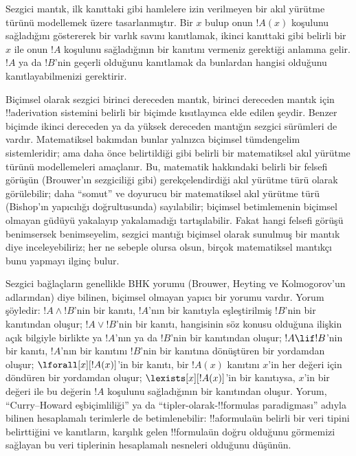 \documentclass[../../../include/open-logic-section]{subfiles}
\begin{document}
Sezgici mantık, ilk kanıttaki gibi hamlelere izin verilmeyen bir akıl yürütme
türünü modellemek üzere tasarlanmıştır. Bir $x$ bulup onun $!A(x)$ koşulunu
sağladığını göstererek bir varlık savını kanıtlamak, ikinci kanıttaki gibi
belirli bir~$x$ ile onun $!A$
koşulunu sağladığının bir kanıtını vermeniz gerektiği anlamına gelir. $!A$ ya
da $!B$'nin geçerli olduğunu kanıtlamak da bunlardan hangisi olduğunu
kanıtlayabilmenizi gerektirir.

Biçimsel olarak sezgici birinci dereceden mantık, birinci dereceden mantık için
!!a{derivation} sistemini belirli bir biçimde kısıtlayınca elde edilen şeydir.
Benzer biçimde ikinci dereceden ya da yüksek dereceden mantığın sezgici
sürümleri de vardır. Matematiksel bakımdan bunlar yalnızca biçimsel tümdengelim
sistemleridir; ama daha önce belirtildiği gibi belirli bir matematiksel akıl
yürütme türünü modellemeleri amaçlanır. Bu, matematik hakkındaki belirli bir
felsefi görüşün (Brouwer'ın sezgiciliği gibi) gerekçelendirdiği akıl yürütme
türü olarak görülebilir; daha ``somut'' ve doyurucu bir matematiksel akıl
yürütme türü (Bishop'ın yapıcılığı doğrultusunda) sayılabilir; biçimsel
betimlemenin biçimsel olmayan güdüyü yakalayıp yakalamadığı tartışılabilir.
Fakat hangi felsefi görüşü benimsersek benimseyelim, sezgici mantığı biçimsel
olarak sunulmuş bir mantık diye inceleyebiliriz; her ne sebeple olursa olsun,
birçok matematiksel mantıkçı bunu yapmayı ilginç bulur.

Sezgici bağlaçların genellikle BHK yorumu (Brouwer, Heyting ve Kolmogorov'un
adlarından) diye bilinen, biçimsel olmayan yapıcı bir yorumu vardır. Yorum
şöyledir: $!A \land !B$'nin bir kanıtı, $!A$'nın bir kanıtıyla eşleştirilmiş
$!B$'nin bir kanıtından oluşur; $!A \lor !B$'nin bir kanıtı, hangisinin söz
konusu olduğuna ilişkin açık bilgiyle birlikte ya $!A$'nın ya da $!B$'nin bir
kanıtından oluşur; $!A \lif !B$'nin bir kanıtı, $!A$'nın bir kanıtını
$!B$'nin bir kanıtına dönüştüren bir yordamdan oluşur; $\lforall[x][!A(x)]$'in
bir kanıtı, bir $!A(x)$ kanıtını $x$'in her değeri için döndüren bir yordamdan
oluşur; $\lexists[x][!A(x)]$'in bir kanıtıysa, $x$'in bir değeri ile bu değerin
$!A$ koşulunu sağladığının bir kanıtından oluşur. Yorum, ``Curry--Howard
eşbiçimliliği'' ya da ``tipler-olarak-!!{formula}s paradigması'' adıyla bilinen
hesaplamalı terimlerle de betimlenebilir: !!a{formula}{}ün belirli bir veri
tipini belirttiğini ve kanıtların, karşılık gelen !!{formula}{}ün doğru olduğunu
görmemizi sağlayan bu veri tiplerinin hesaplamalı nesneleri olduğunu düşünün.
\end{document}
